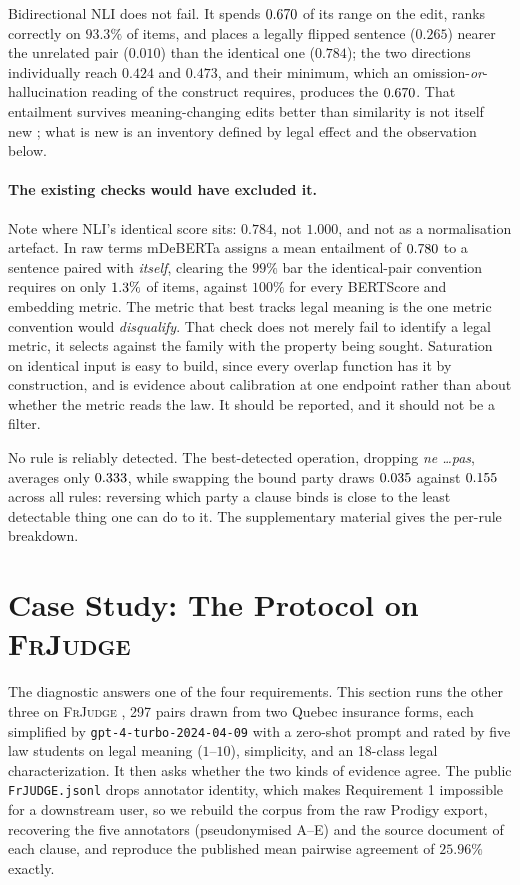 \documentclass[11pt]{article}
\begin{document}
Bidirectional NLI does not fail. It spends $0.670$ of its range on the
edit, ranks correctly on $93.3\%$ of items, and places a legally flipped
sentence ($0.265$) nearer the unrelated pair ($0.010$) than the identical one
($0.784$); the two directions individually reach $0.424$ and $0.473$, and their
minimum, which an omission-\emph{or}-hallucination reading of the construct
requires, produces the $0.670$. That entailment survives meaning-changing
edits better than similarity is not itself new \citep{chen2023menli}; what is
new is an inventory defined by legal effect and the observation below.

\paragraph{The existing checks would have excluded it.}
Note where NLI's identical score sits: $0.784$, not $1.000$, and not as a
normalisation artefact. In raw terms mDeBERTa assigns a mean entailment of
$0.780$ to a sentence paired with \emph{itself}, clearing the $99\%$ bar
the identical-pair convention requires on only $1.3\%$ of items,
against $100\%$ for every BERTScore and embedding metric. The metric that best
tracks legal meaning is the one metric convention would \emph{disqualify}. That
check does not merely fail to identify a legal metric, it selects against the
family with the property being sought. Saturation on identical input is easy to
build, since every overlap function has it by construction, and is evidence
about calibration at one endpoint rather than about whether the metric reads the
law. It should be reported, and it should not be a filter.

No rule is reliably detected. The best-detected operation, dropping \emph{ne
\dots pas}, averages only $0.333$, while swapping the bound party
draws $0.035$ against $0.155$ across all rules: reversing
which party a clause binds is close to the least detectable thing one can do to
it. The supplementary material gives the per-rule breakdown.

\section{Case Study: The Protocol on \textsc{FrJudge}}
\label{sec:casestudy}

The diagnostic answers one of the four requirements. This section runs the other
three on \textsc{FrJudge} \citep{beauchemin2025judgebert}, 297 pairs drawn from
two Quebec insurance forms, each simplified by \texttt{gpt-4-turbo-2024-04-09}
with a zero-shot prompt and rated by five law students on legal meaning
($1$--$10$), simplicity, and an 18-class legal characterization. It then asks
whether the two kinds of evidence agree. The public \texttt{FrJUDGE.jsonl} drops
annotator identity, which makes Requirement 1 impossible for a downstream user,
so we rebuild the corpus from the raw Prodigy export, recovering the five
annotators (pseudonymised A--E) and the source document of each clause, and
reproduce the published mean pairwise agreement of $25.96\%$ exactly.
\end{document}
